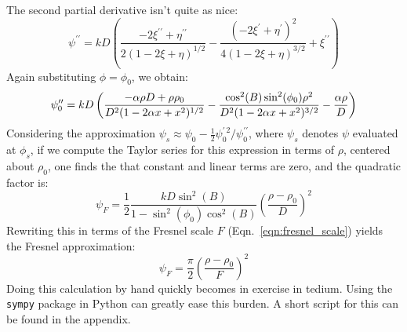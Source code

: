 \documentclass{article}
\theoremstyle{plain}
\begin{document}
        The second partial derivative isn't quite as nice:
        \begin{equation}
            \psi^{\prime\prime}
            =kD\left(
                    \frac{-2\xi^{\prime\prime}+\eta^{\prime\prime}}
                          {2(1-2\xi+\eta)^{1/2}}-
                    \frac{(-2\xi^{\prime}+\eta^{\prime})^{2}}
                         {4(1-2\xi+\eta)^{3/2}}+
                    \xi^{\prime\prime}
            \right)
        \end{equation}
        Again substituting $\phi=\phi_{0}$, we obtain:
        \begin{equation}
            \label{eqn:psi_2prime_phi0}
            \psi^{\prime\prime}_{0}
            =kD\left(
                \frac{%
                    -\alpha\rho{D}+\rho\rho_{0}
                }{%
                    D^{2}(1-2\alpha{x}+x^{2})^{1/2}
                }
                -\frac{%
                    \cos^{2}(B)\sin^{2}(\phi_{0})\rho^{2}
                }{%
                    D^{2}(1-2\alpha{x}+x^{2})^{3/2}
                }
                -\frac{\alpha\rho}{D}
            \right)
        \end{equation}
        Considering the approximation
        $%
            \psi_{s}\approx%
            \psi_{0}-\frac{1}{2}\psi^{\prime\,2}_{0}/\psi^{\prime\prime}_{0}%
        $,
        where $\psi_{s}$ denotes $\psi$ evaluated at $\phi_{s}$,
        if we compute the Taylor series for this expression in terms of
        $\rho$, centered about $\rho_{0}$, one finds the that constant and
        linear terms are zero, and the quadratic factor is:
        \begin{equation}
            \psi_{F}=
            \frac{1}{2}
            \frac{kD\sin^{2}(B)}{1-\sin^{2}(\phi_{0})\cos^{2}(B)}
            \left(
                \frac{\rho-\rho_{0}}{D}
            \right)^{2}
        \end{equation}
        Rewriting this in terms of the Fresnel scale $F$
        (Eqn.~\ref{eqn:fresnel_scale}) yields the Fresnel approximation:
        \begin{equation}
            \psi_{F}
            =\frac{\pi}{2}\left(
                \frac{\rho-\rho_{0}}{F}
            \right)^{2}
        \end{equation}
        Doing this calculation by hand quickly becomes in exercise in tedium.
        Using the \texttt{sympy} package in Python can greatly ease this burden.
        A short script for this can be found in the appendix.
        \par\hfill\par
\end{document}
